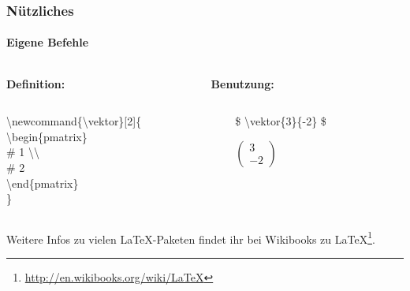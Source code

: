 
\begin{frame}
\frametitle{Nützliches}
\framesubtitle{Eigene Befehle}
\begin{columns}
\hspace*{4.7mm}
\begin{column}{0.5\textwidth}
\textbf{Definition:}\\
\end{column}
\begin{column}{0.5\textwidth}
\textbf{Benutzung:}\\
\end{column}
\end{columns}
\bigskip
\begin{columns}
\hspace*{4.7mm}
\begin{column}{0.5\textwidth}
\begin{ttfamily}{\normalsize
\color{nounibaredI}\textbackslash newcommand\color{black}\{\textbackslash vektor\}[2]\{\\
\color{unibablueI}\textbackslash begin\color{black}\{pmatrix\}\\
\color{unibayellowI}\# 1 \color{nounibaredI}\textbackslash \textbackslash\\
\color{unibayellowI} \# 2\\
\color{unibablueI}\textbackslash end\color{black}\{pmatrix\}\\
\}\\
}
\end{ttfamily}
\end{column}
\begin{column}{0.5\textwidth}
\begin{ttfamily}{\normalsize
\color{unibayellowI}\$ \color{nounibaredI}\textbackslash vektor\color{black}\{3\}\{-2\} \color{unibayellowI}\$ \\}
\end{ttfamily}
\medskip
$
\begin{pmatrix}
3 \\ -2
\end{pmatrix}
$
\end{column}
\end{columns}
\bigskip
Weitere Infos zu vielen \LaTeX -Paketen findet ihr bei Wikibooks zu \LaTeX\footnote{\url{http://en.wikibooks.org/wiki/LaTeX}}.\\
\end{frame}

